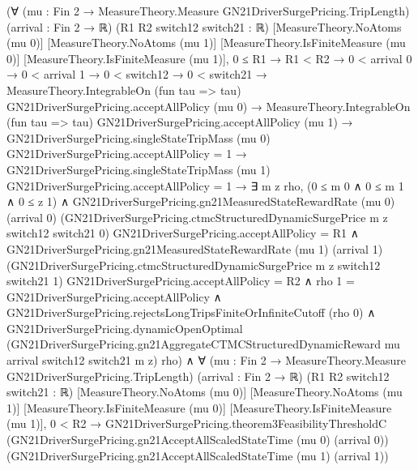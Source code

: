 \documentclass[10pt]{article}
\begin{document}
\begin{ReviewVerbatim}
(∀ (mu : Fin 2 → MeasureTheory.Measure GN21DriverSurgePricing.TripLength) (arrival : Fin 2 → ℝ)
    (R1 R2 switch12 switch21 : ℝ) [MeasureTheory.NoAtoms (mu 0)] [MeasureTheory.NoAtoms (mu 1)]
    [MeasureTheory.IsFiniteMeasure (mu 0)] [MeasureTheory.IsFiniteMeasure (mu 1)],
    0 ≤ R1 →
      R1 < R2 →
        0 < arrival 0 →
          0 < arrival 1 →
            0 < switch12 →
              0 < switch21 →
                MeasureTheory.IntegrableOn (fun tau => tau) GN21DriverSurgePricing.acceptAllPolicy (mu 0) →
                  MeasureTheory.IntegrableOn (fun tau => tau) GN21DriverSurgePricing.acceptAllPolicy (mu 1) →
                    GN21DriverSurgePricing.singleStateTripMass (mu 0) GN21DriverSurgePricing.acceptAllPolicy = 1 →
                      GN21DriverSurgePricing.singleStateTripMass (mu 1) GN21DriverSurgePricing.acceptAllPolicy = 1 →
                        ∃ m z rho,
                          (0 ≤ m 0 ∧ 0 ≤ m 1 ∧ 0 ≤ z 1) ∧
                            GN21DriverSurgePricing.gn21MeasuredStateRewardRate (mu 0) (arrival 0)
                                  (GN21DriverSurgePricing.ctmcStructuredDynamicSurgePrice m z switch12 switch21 0)
                                  GN21DriverSurgePricing.acceptAllPolicy =
                                R1 ∧
                              GN21DriverSurgePricing.gn21MeasuredStateRewardRate (mu 1) (arrival 1)
                                    (GN21DriverSurgePricing.ctmcStructuredDynamicSurgePrice m z switch12 switch21 1)
                                    GN21DriverSurgePricing.acceptAllPolicy =
                                  R2 ∧
                                rho 1 = GN21DriverSurgePricing.acceptAllPolicy ∧
                                  GN21DriverSurgePricing.rejectsLongTripsFiniteOrInfiniteCutoff (rho 0) ∧
                                    GN21DriverSurgePricing.dynamicOpenOptimal
                                      (GN21DriverSurgePricing.gn21AggregateCTMCStructuredDynamicReward mu arrival
                                        switch12 switch21 m z)
                                      rho) ∧
  ∀ (mu : Fin 2 → MeasureTheory.Measure GN21DriverSurgePricing.TripLength) (arrival : Fin 2 → ℝ)
    (R1 R2 switch12 switch21 : ℝ) [MeasureTheory.NoAtoms (mu 0)] [MeasureTheory.NoAtoms (mu 1)]
    [MeasureTheory.IsFiniteMeasure (mu 0)] [MeasureTheory.IsFiniteMeasure (mu 1)],
    0 < R2 →
      GN21DriverSurgePricing.theorem3FeasibilityThresholdC
            (GN21DriverSurgePricing.gn21AcceptAllScaledStateTime (mu 0) (arrival 0))
            (GN21DriverSurgePricing.gn21AcceptAllScaledStateTime (mu 1) (arrival 1))

\end{ReviewVerbatim}
\end{document}
